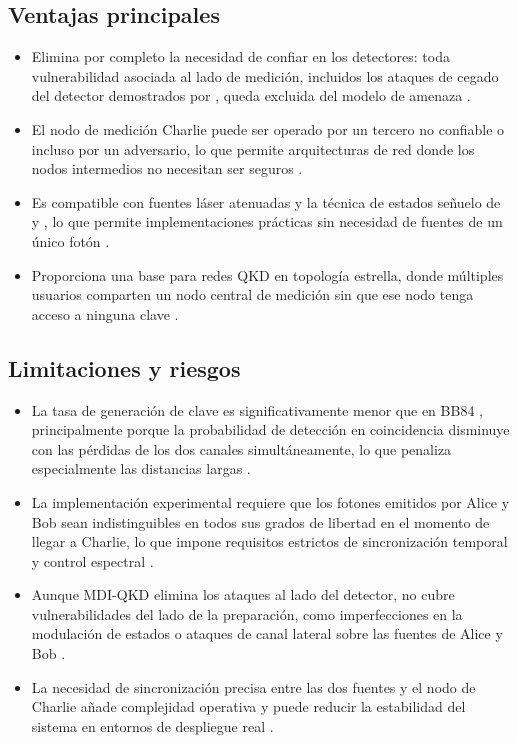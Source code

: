 \subsection{Ventajas principales}
\begin{itemize}
    \item Elimina por completo la necesidad de confiar en los detectores: toda vulnerabilidad asociada al lado de medición, incluidos los ataques de cegado del detector demostrados por \cite{lydersen2010}, queda excluida del modelo de amenaza \citep{lo2012}.
    \item El nodo de medición Charlie puede ser operado por un tercero no confiable o incluso por un adversario, lo que permite arquitecturas de red donde los nodos intermedios no necesitan ser seguros \citep{lo2012,braunstein2012}.
    \item Es compatible con fuentes láser atenuadas y la técnica de estados señuelo de \cite{lo2005} y \cite{wang2005}, lo que permite implementaciones prácticas sin necesidad de fuentes de un único fotón \citep{lo2012,curty2014}.
    \item Proporciona una base para redes QKD en topología estrella, donde múltiples usuarios comparten un nodo central de medición sin que ese nodo tenga acceso a ninguna clave \citep{curty2014,lo2014}.
\end{itemize}

\subsection{Limitaciones y riesgos}
\begin{itemize}
    \item La tasa de generación de clave es significativamente menor que en BB84 \citep{bennett1984}, principalmente porque la probabilidad de detección en coincidencia disminuye con las pérdidas de los dos canales simultáneamente, lo que penaliza especialmente las distancias largas \citep{lo2012,curty2014}.
    \item La implementación experimental requiere que los fotones emitidos por Alice y Bob sean indistinguibles en todos sus grados de libertad en el momento de llegar a Charlie, lo que impone requisitos estrictos de sincronización temporal y control espectral \citep{lo2012,gisin2002}.
    \item Aunque MDI-QKD elimina los ataques al lado del detector, no cubre vulnerabilidades del lado de la preparación, como imperfecciones en la modulación de estados o ataques de canal lateral sobre las fuentes de Alice y Bob \citep{scarani2009,curty2014}.
    \item La necesidad de sincronización precisa entre las dos fuentes y el nodo de Charlie añade complejidad operativa y puede reducir la estabilidad del sistema en entornos de despliegue real \citep{lo2012,lo2014}.
\end{itemize}

